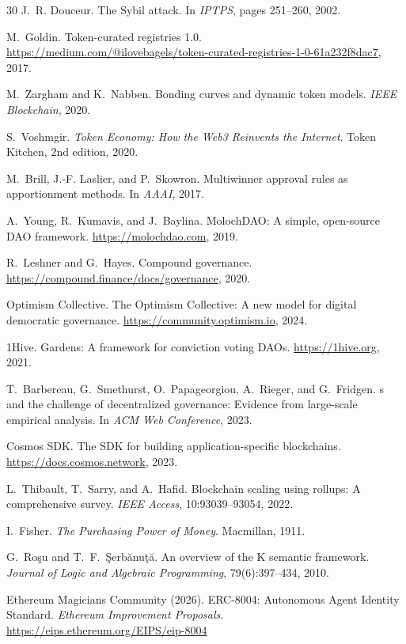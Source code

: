 \documentclass{article}
\begin{document}
\begin{thebibliography}{30}
J.~R. Douceur.
\newblock The {S}ybil attack.
\newblock In \emph{IPTPS}, pages 251--260, 2002.

M.~Goldin.
\newblock Token-curated registries 1.0.
\newblock \url{https://medium.com/@ilovebagels/token-curated-registries-1-0-61a232f8dac7}, 2017.

M.~Zargham and K.~Nabben.
\newblock Bonding curves and dynamic token models.
\newblock \emph{IEEE Blockchain}, 2020.

S.~Voshmgir.
\newblock \emph{Token Economy: How the {W}eb3 Reinvents the Internet}.
\newblock Token Kitchen, 2nd edition, 2020.

M.~Brill, J.-F. Laslier, and P.~Skowron.
\newblock Multiwinner approval rules as apportionment methods.
\newblock In \emph{AAAI}, 2017.

A.~Young, R.~Kumavis, and J.~Baylina.
\newblock Moloch{DAO}: A simple, open-source {DAO} framework.
\newblock \url{https://molochdao.com}, 2019.

R.~Leshner and G.~Hayes.
\newblock Compound governance.
\newblock \url{https://compound.finance/docs/governance}, 2020.

Optimism Collective.
\newblock The Optimism Collective: A new model for digital democratic governance.
\newblock \url{https://community.optimism.io}, 2024.

1Hive.
\newblock Gardens: A framework for conviction voting {DAO}s.
\newblock \url{https://1hive.org}, 2021.

T.~Barbereau, G.~Smethurst, O.~Papageorgiou, A.~Rieger, and G.~Fridgen.
s and the challenge of decentralized governance: Evidence from large-scale empirical analysis.
\newblock In \emph{ACM Web Conference}, 2023.

Cosmos SDK.
\newblock The {SDK} for building application-specific blockchains.
\newblock \url{https://docs.cosmos.network}, 2023.

L.~Thibault, T.~Sarry, and A.~Hafid.
\newblock Blockchain scaling using rollups: A comprehensive survey.
\newblock \emph{IEEE Access}, 10:93039--93054, 2022.

I.~Fisher.
\newblock \emph{The Purchasing Power of Money}.
\newblock Macmillan, 1911.

G.~Ro\c{s}u and T.~F.~\c{S}erb\u{a}nu\c{t}\u{a}.
\newblock An overview of the {K} semantic framework.
\newblock \emph{Journal of Logic and Algebraic Programming}, 79(6):397--434, 2010.

Ethereum Magicians Community (2026).
\newblock ERC-8004: Autonomous Agent Identity Standard.
\newblock \textit{Ethereum Improvement Proposals}.
\newblock \url{https://eips.ethereum.org/EIPS/eip-8004}

\end{thebibliography}
\end{document}
